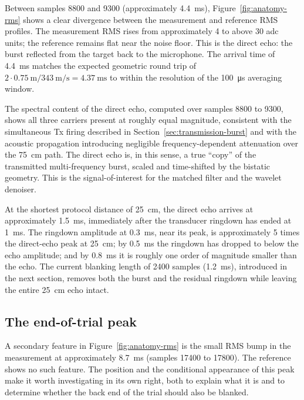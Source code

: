 Between samples \num{8800} and \num{9300}
(approximately \SI{4.4}{\milli\second}), Figure~\ref{fig:anatomy-rms}
shows a clear divergence between the measurement and reference RMS
profiles. The measurement RMS rises from approximately \num{4} to
above \num{30} \gls{adc} units; the reference remains flat near
the noise floor. This is the direct echo: the burst reflected from
the target back to the microphone. The arrival time of
\SI{4.4}{\milli\second} matches the expected geometric round trip
of $2 \cdot \SI{0.75}{\meter} / \SI{343}{\meter\per\second} =
\SI{4.37}{\milli\second}$ to within the resolution of the
\SI{100}{\micro\second} averaging window.

The spectral content of the direct echo, computed over samples
\num{8800} to \num{9300}, shows all three carriers present at
roughly equal magnitude, consistent with the simultaneous Tx
firing described in Section~\ref{sec:transmission-burst} and with
the acoustic propagation introducing negligible
frequency-dependent attenuation over the \SI{75}{cm} path. The
direct echo is, in this sense, a true ``copy'' of the transmitted
multi-frequency burst, scaled and time-shifted by the bistatic
geometry. This is the signal-of-interest for the matched filter
and the wavelet denoiser.

At the shortest protocol distance of \SI{25}{cm}, the direct echo
arrives at approximately \SI{1.5}{\milli\second}, immediately after
the transducer ringdown has ended at \SI{1}{\milli\second}. The
ringdown amplitude at \SI{0.3}{\milli\second}, near its peak, is
approximately \num{5} times the direct-echo peak at \SI{25}{cm};
by \SI{0.5}{\milli\second} the ringdown has dropped to below the
echo amplitude; and by \SI{0.8}{\milli\second} it is roughly one
order of magnitude smaller than the echo. The current blanking
length of \num{2400} samples (\SI{1.2}{\milli\second}), introduced
in the next section, removes both the burst and the residual
ringdown while leaving the entire \SI{25}{cm} echo intact.

\subsection{The end-of-trial peak}
\label{sec:end-peak}

A secondary feature in Figure~\ref{fig:anatomy-rms} is the small
RMS bump in the measurement at approximately
\SI{8.7}{\milli\second} (samples 17400 to 17800). The reference
shows no such feature. The position and the conditional appearance
of this peak make it worth investigating in its own right, both to
explain what it is and to determine whether the back end of the
trial should also be blanked.

